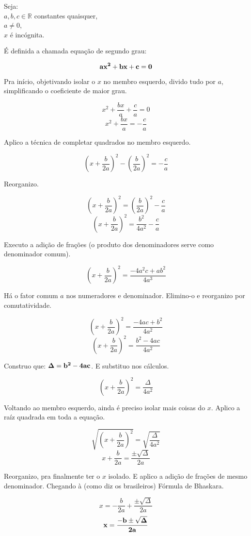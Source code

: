 \documentclass[12pt]{article}
\begin{document}
\maketitle

Seja:\\
$a, b, c \in \mathbb{R}$ constantes quaisquer,\\
$a \neq 0$,\\
$x$ é incógnita.

É definida a chamada equação de segundo grau:

$$ {\bf ax^2 + bx + c = 0} $$

Pra início, objetivando isolar o $x$ no membro esquerdo, divido tudo
por $a$, simplificando o coeficiente de maior grau.

$$ x^2 + \frac{bx}{a} + \frac{c}{a} = 0 $$
$$ x^2 + \frac{bx}{a} = -\frac{c}{a} $$

Aplico a técnica de completar quadrados no membro esquerdo.

$$ \left(x + \frac{b}{2a}\right)^2 - \left(\frac{b}{2a}\right)^2 =
- \frac{c}{a} $$

Reorganizo.

$$ \left(x + \frac{b}{2a}\right)^2 
= \left(\frac{b}{2a}\right)^2 - \frac{c}{a} $$
$$ \left(x + \frac{b}{2a}\right)^2 
= \frac{b^2}{4a^2} - \frac{c}{a} $$

Executo a adição de frações (o produto dos denominadores serve
como denominador comum).

$$ \left(x + \frac{b}{2a}\right)^2 
= \frac{-4a^2c + ab^2}{4a^3} $$

Há o fator comum $a$ nos numeradores e denominador. Elimino-o e reorganizo por comutatividade.

$$ \left(x + \frac{b}{2a}\right)^2 
= \frac{-4ac + b^2}{4a^2} $$
$$ \left(x + \frac{b}{2a}\right)^2 
= \frac{b^2 - 4ac}{4a^2} $$

Construo que: $ {\bf \Delta = b^2 - 4ac } $. E substituo nos cálculos.

$$ \left(x + \frac{b}{2a}\right)^2 
= \frac{\Delta}{4a^2} $$

Voltando ao membro esquerdo, ainda é preciso isolar mais coisas do $x$. Aplico a raíz quadrada em toda a equação.

$$ \sqrt{\left(x + \frac{b}{2a}\right)^2} 
= \sqrt{\frac{\Delta}{4a^2}} $$
$$ x + \frac{b}{2a}
= \frac{\pm\sqrt{\Delta}}{2a} $$

Reorganizo, pra finalmente ter o $x$ isolado. E aplico a adição de frações de mesmo denominador. Chegando à (como diz os brasileiros) Fórmula de Bhaskara.

$$ x
= - \frac{b}{2a} + \frac{\pm\sqrt{\Delta}}{2a}$$
$$ {\bf x
= \frac{-b \pm\sqrt{\Delta}}{2a}}$$
\end{document}
